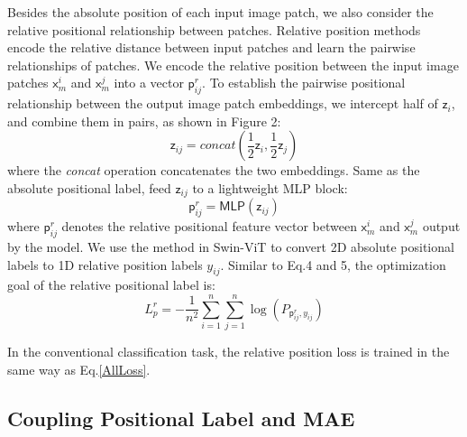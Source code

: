 \documentclass{article}
\begin{document}
Besides the absolute position of each input image patch, we also consider the relative positional relationship between patches. Relative position methods encode the relative distance between input patches and learn the pairwise relationships of patches. We encode the relative position between the input image patches $\mathsf{x}_{m}^{i}$ and $\mathsf{x}_{m}^{j}$ into a vector $\mathsf{p}_{ij}^{r}$. To establish the pairwise positional relationship between the output image patch embeddings, we intercept half of ${{\mathsf{z}}_{i}}$, and combine them in pairs, as shown in Figure 2:
\begin{equation}
{{\mathsf{z}}_{ij}}=concat\left( \frac{1}{2}{{\mathsf{z}}_{i}},\frac{1}{2}{{\mathsf{z}}_{j}} \right)
  \label{eq:5}
\end{equation}
where the \emph{concat} operation concatenates the two embeddings. Same as the absolute positional label, feed ${{\mathsf{z}}_{ij}}$ to a lightweight MLP block:
\begin{equation}
\mathsf{p}_{ij}^{r}=\mathsf{MLP}\left( {{\mathsf{z}}_{ij}} \right)
  \label{eq:6}
\end{equation}
where $\mathsf{p}_{ij}^{r}$ denotes the relative positional feature vector between $\mathsf{x}_{m}^{i}$ and $\mathsf{x}_{m}^{j}$ output by the model. We use the method in Swin-ViT \cite{Liu_2021_ICCV} to convert 2D absolute positional labels to 1D relative position labels ${{y}_{ij}}$. Similar to Eq.4 and 5, the optimization goal of the relative positional label is:
\begin{equation}
L_{p}^{r}=-\frac{1}{{{n}^{2}}}\sum\limits_{i=1}^{n}{\sum\limits_{j=1}^{n}{\log \left( {{P}_{\mathsf{p}_{ij}^{r},{{y}_{ij}}}} \right)}}
  \label{eq:7}
\end{equation}

In the conventional classification task, the relative position loss is trained in the same way as Eq.\ref{AllLoss}.


\subsection{Coupling Positional Label and MAE}
\end{document}
